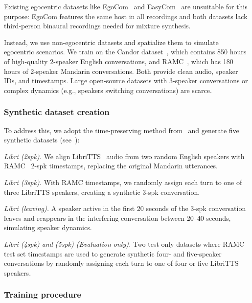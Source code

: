 Existing egocentric datasets like EgoCom~\cite{egocom} and EasyCom~\cite{easycom} are unsuitable for this purpose:  EgoCom features the same host in all recordings and  both datasets   lack third-person binaural recordings needed for  mixture synthesis. 


Instead, we use non-egocentric datasets and spatialize them to simulate egocentric scenarios. We train on the Candor dataset~\cite{candor}, which contains 850 hours of high-quality 2-speaker English conversations, and RAMC~\cite{ramc}, which has 180 hours of 2-speaker Mandarin conversations. Both provide clean audio, speaker IDs, and timestamps. Large open-source datasets with 3-speaker conversations or complex dynamics (e.g., speakers switching conversations) are scarce.


\subsubsection{Synthetic dataset creation}
To address this, we adopt the time-preserving method from~\cite{tce} and generate {five} synthetic datasets (see~):
\squishlist
    \item {\it Libri (2spk).} We align LibriTTS~\cite{zen2019libritts} audio from two random English speakers with RAMC~\cite{ramc} 2-spk timestamps, replacing the original Mandarin utterances.
    
    \item {\it Libri (3spk).} With RAMC timestamps, we randomly assign each turn to one of three LibriTTS speakers, creating a synthetic 3-spk conversation.
    
    \item {\it Libri (leaving).} A speaker active in the first 20 seconds of the 3-spk conversation leaves and reappears in the interfering conversation between 20–40 seconds, simulating speaker dynamics.

    \item {\it Libri (4spk) and (5spk) (Evaluation only).} {Two test-only datasets where RAMC test set timestamps are used to generate synthetic four- and five-speaker conversations by randomly assigning each turn to one of four or five LibriTTS speakers.}

    
\squishend

\subsubsection{Training procedure}\label{sec:trainingrecipe}


